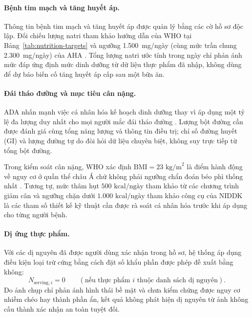 \paragraph{Bệnh tim mạch và tăng huyết áp.}
Thông tin bệnh tim mạch và tăng huyết áp được quản lý bằng các cờ hồ sơ độc lập. Đối chiếu lượng natri tham khảo hướng dẫn của WHO tại Bảng~\ref{tab:nutrition-targets} và ngưỡng 1.500~mg/ngày (cùng mức trần chung 2.300~mg/ngày) của AHA \cite{ahaSodium}. Tổng lượng natri ước tính trong ngày chỉ phản ánh mức đáp ứng định mức dinh dưỡng từ dữ liệu thực phẩm đã nhập, không dùng để dự báo biến cố tăng huyết áp cấp sau một bữa ăn.

\paragraph{Đái tháo đường và mục tiêu cân nặng.}
ADA nhấn mạnh việc cá nhân hóa kế hoạch dinh dưỡng thay vì áp dụng một tỷ lệ đa lượng duy nhất cho mọi người mắc đái tháo đường \cite{adaNutrition2026}. Lượng bột đường cần được đánh giá cùng tổng năng lượng và thông tin điều trị; chỉ số đường huyết (GI) và lượng đường tự do đòi hỏi dữ liệu chuyên biệt, không suy trực tiếp từ tổng bột đường.

Trong kiểm soát cân nặng, WHO xác định $\mathrm{BMI} = 23\text{ kg/m}^2$ là điểm hành động về nguy cơ ở quần thể châu Á chứ không phải ngưỡng chẩn đoán béo phì thống nhất \cite{whoAsianBMI2004}. Tương tự, mức thâm hụt $500\text{ kcal/ngày}$ tham khảo từ các chương trình giảm cân \cite{adaWeight2026} và ngưỡng chặn dưới $1.000\text{ kcal/ngày}$ tham khảo công cụ của NIDDK \cite{niddkBodyWeightPlanner} là các tham số thiết kế kỹ thuật cần được rà soát cá nhân hóa trước khi áp dụng cho từng người bệnh.

\paragraph{Dị ứng thực phẩm.}
Với các dị nguyên đã được người dùng xác nhận trong hồ sơ, hệ thống áp dụng điều kiện loại trừ cứng bằng cách đặt số khẩu phần được phép đề xuất bằng không:
\begin{equation}
    N_{\mathrm{serving}, i} = 0 \qquad (\text{nếu thực phẩm } i \text{ thuộc danh sách dị nguyên}).
    \label{eq:allergy-constraint}
\end{equation}
Do ảnh chụp chỉ phản ánh hình thái bề mặt và chưa kiểm chứng được nguy cơ nhiễm chéo hay thành phần ẩn, kết quả không phát hiện dị nguyên từ ảnh không cấu thành xác nhận an toàn tuyệt đối.

